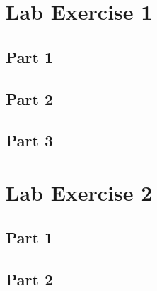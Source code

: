 \begin{appendices}
	\label{Appendix:start}
	\section{Lab Exercise 1}
	{
		\subsection{Part 1}
		{
			\label{appendix:ex1-1}
			
		}
		\subsection{Part 2}
		{
			\label{appendix:ex1-2}
			
		}
		\subsection{Part 3}
		{
			\label{appendix:ex1-3}
			
		}
	}
	\section{Lab Exercise 2}
	{
		\subsection{Part 1}
		{
			\label{appendix:ex2-1}
			
		}
		\subsection{Part 2}
		{
			\label{appendix:ex2-2}
			
		}
	}

\end{appendices}